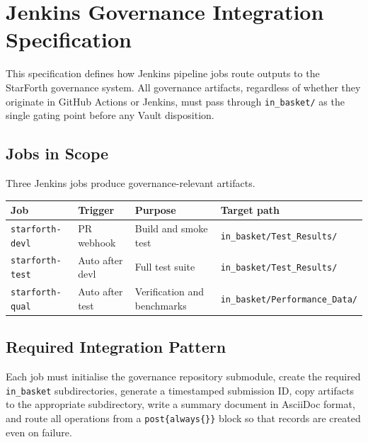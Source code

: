 
\section{Jenkins Governance Integration Specification}

This specification defines how Jenkins pipeline jobs route outputs to the StarForth
governance system. All governance artifacts, regardless of whether they originate in
GitHub Actions or Jenkins, must pass through \texttt{in\_basket/} as the single gating
point before any Vault disposition.

\subsection{Jobs in Scope}

Three Jenkins jobs produce governance-relevant artifacts.

\begin{center}
\begin{tabular}{llll}
\toprule
Job & Trigger & Purpose & Target path \\
\midrule
\texttt{starforth-devl} & PR webhook & Build and smoke test &
  \texttt{in\_basket/Test\_Results/} \\
\texttt{starforth-test} & Auto after devl & Full test suite &
  \texttt{in\_basket/Test\_Results/} \\
\texttt{starforth-qual} & Auto after test & Verification and benchmarks &
  \texttt{in\_basket/Performance\_Data/} \\
\bottomrule
\end{tabular}
\end{center}

\subsection{Required Integration Pattern}

Each job must initialise the governance repository submodule, create the required
\texttt{in\_basket} subdirectories, generate a timestamped submission ID, copy artifacts
to the appropriate subdirectory, write a summary document in AsciiDoc format, and
route all operations from a \texttt{post\{always\{\}\}} block so that records are
created even on failure.


